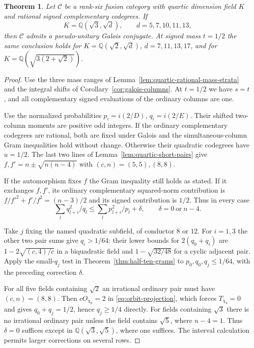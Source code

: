 \documentclass[11pt,reqno]{amsart}
\newtheorem{theorem}{Theorem}[section]
\theoremstyle{remark}\newtheorem{remark}[theorem]{Remark}
\numberwithin{equation}{section}
\begin{document}
\begin{theorem}\label{thm:quartic-three-rational}
Let $\mathcal C$ be a rank-six fusion category with quartic dimension
field $K$ and rational signed complementary codegrees. If
\[
 K=\mathbb Q(\sqrt3,\sqrt d),\qquad d=5,7,10,11,13,
\]
then $\mathcal C$ admits a pseudo-unitary Galois conjugate.
At signed mass $t=1/2$ the same conclusion holds for
$K=\mathbb Q(\sqrt2,\sqrt d)$, $d=7,11,13,17$, and for
$K=\mathbb Q(\sqrt{3(2+\sqrt2)})$.
\end{theorem}
\begin{proof}
Use the three mass ranges of Lemma~\ref{lem:quartic-rational-mass-strata}
and the integral shifts of Corollary~\ref{cor:galois-columns}.
At $t=1/2$ we have $s=t$, and all complementary signed evaluations
of the ordinary columns are one.

Use the normalized probabilities $p_i=i(2/D)$, $q_i=i(2/E)$.
Their shifted two-column moments are positive odd integers. If the
ordinary complementary codegrees are rational, both are fixed under
Galois and the simultaneous-column Gram inequalities hold without
change. Otherwise their quadratic codegrees have $u=1/2$. The last two lines
of Lemma~\ref{lem:quartic-short-pairs} give
$f,f'=n\pm\sqrt{n(n-4)}$ with $(c,n)=(5,5),(8,8)$.

If the automorphism
fixes $f$ the Gram inequality still holds as stated. If it
exchanges $f,f'$, its ordinary complementary squared-norm contribution
is $f/f'^2+f'/f^2=(n-3)/2$ and its signed contribution is $1/2$.
Thus in every case
\[
 \sum_l q_{l+i}^2/q_l\le \sum_l p_{l+i}^2/p_l+\delta,
 \qquad \delta=0\ \text{or}\ n-4.
\]

Take $j$ fixing the named quadratic subfield, of conductor $8$ or
$12$. For $i=1,3$ the other two pair sums give $q_i>1/64$:
their lower bounds for $2(q_0+q_i)$ are $1-2\sqrt{(c,4)/c}$ in
a biquadratic field and $1-\sqrt{32/48}$ for a cyclic adjacent
pair. Apply the small-$q_j$ test in Theorem~\ref{thm:half-ten-grams}
to $p_0,q_0,q_j\le1/64$, with the preceding correction $\delta$.

For all five fields containing $\sqrt2$ an irrational ordinary
pair must have $(c,n)=(8,8)$. Then $c O_{\chi_8}=2$ in \eqref{eq:orbit-projection}, which forces $T_{\chi_8}=0$ and gives $q_0+q_j=1/2$, hence $q_j\ge1/4$ directly.
For fields containing $\sqrt3$ there is no irrational ordinary
pair unless the field contains $\sqrt5$, where $n-4=1$.
Thus $\delta=0$ suffices except in $\mathbb Q(\sqrt3,\sqrt5)$,
where one suffices. The interval calculation permits larger
corrections on several rows.


\end{proof}
\end{document}
